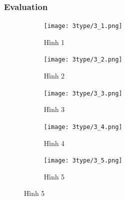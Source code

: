 \documentclass[a4paper]{article}
\begin{document}
\subsubsection*{Evaluation}
\begin{figure}[H] %
  \centering
  \captionsetup{justification=centering, font=small} %
  
  \begin{subfigure}[b]{0.48\textwidth}
    \centering
    \texttt{[image: 3type/3\_1.png]}
    \caption{Hình 1}
    \label{fig:1}
  \end{subfigure}
  \hfill
  \begin{subfigure}[b]{0.48\textwidth}
    \centering
    \texttt{[image: 3type/3\_2.png]}
    \caption{Hình 2}
    \label{fig:2}
  \end{subfigure}

  \vspace{10cm} %
  
  \begin{subfigure}[b]{0.48\textwidth}
    \centering
    \texttt{[image: 3type/3\_3.png]}
    \caption{Hình 3}
    \label{fig:3}
  \end{subfigure}
  \hfill
  \begin{subfigure}[b]{0.48\textwidth}
    \centering
    \texttt{[image: 3type/3\_4.png]}
    \caption{Hình 4}
    \label{fig:4}
  \end{subfigure}
  
  \vspace{0.1cm}
  
  \begin{subfigure}[b]{0.48\textwidth}
    \centering
    \texttt{[image: 3type/3\_5.png]}
    \caption{Hình 5}
    \label{fig:5}
  \end{subfigure}
  
  \label{fig:all_images_part1}
\end{figure}
\end{document}
